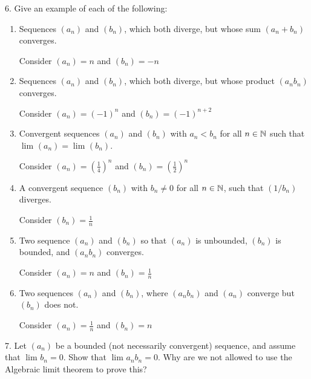 6. Give an example of each of the following:
\begin{enumerate}
	\item Sequences $\left( a_n \right)$ and $ \left( b_n \right) $, which both diverge, but whose sum $\left( a_n + b_n \right) $ converges.

	Consider $\left( a_n \right) = n$ and $\left( b_n \right) = -n$

	\item Sequences $\left( a_n \right) $ and $\left( b_n \right)$, which both diverge, but whose product $\left( a_n b_n \right) $ converges.

	Consider $\left( a_n \right) = \left( -1 \right)^{n}$ and $\left( b_n \right) = \left( -1 \right)^{n+2}$
	\item Convergent sequences $\left( a_n \right) $ and $\left( b_n \right) $ with $a_n < b_n$ for all $n \in \mathbb{N}$ such that $\lim_{} \left( a_n \right) = \lim_{} \left( b_n \right) $.

	Consider $\left( a_n \right) = \left( \frac{1}{4} \right)^{n}$ and $\left( b_n \right) = \left( \frac{1}{2} \right)^{n}$
	\item A convergent sequence $\left( b_n \right) $ with $b_n \neq 0$ for all $n \in \mathbb{N}$, such that $\left( 1 / b_n \right)$ diverges.

	Consider $\left( b_n \right) = \frac{1}{n}$
	\item Two sequence $\left( a_n \right) $ and $\left( b_n \right) $ so that $\left( a_n \right) $ is unbounded, $\left( b_n \right) $ is bounded, and $\left( a_nb_n \right)$ converges.

	Consider $\left( a_n \right) = n$ and $\left( b_n \right) = \frac{1}{n}$
	\item Two sequences $\left( a_n \right)$ and $ \left( b_n \right) $, where $\left( a_n b_n \right) $ and $\left( a_n \right) $ converge but $\left( b_n \right) $ does not.

	Consider $\left( a_n \right) = \frac{1}{n}$ and $\left( b_n \right) = n$
\end{enumerate}

7. Let $\left( a_n \right) $ be a bounded (not necessarily convergent) sequence, and assume that $\lim_{} b_n = 0$. Show that $\lim_{} a_n b_n = 0$. Why are we not allowed to use the Algebraic limit theorem to prove this?

